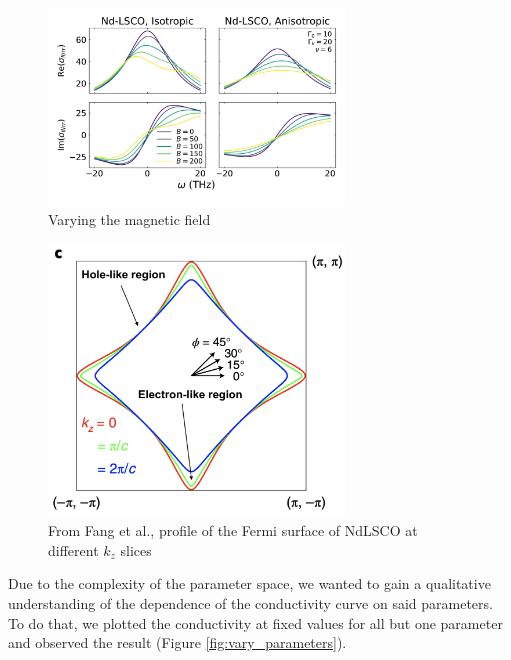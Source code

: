 \begin{figure}
    \centering
    \includegraphics[width=0.7\textwidth]{figures/vary_field}
    \caption{Varying the magnetic field}
    \label{fig:vary_field}
\end{figure}

\begin{figure}
    \centering
    \includegraphics[width=0.7\textwidth]{figures/fermi_surface.png}
    \caption{From Fang et al.\cite{fang2022}, profile of the Fermi surface of NdLSCO at different $k_z$ slices}
    \label{fig:fermi_surface}
\end{figure}


Due to the complexity of the parameter space, 
we wanted to gain a qualitative understanding of the dependence of the conductivity curve on said parameters. 
To do that, we plotted the conductivity at fixed values for all but one parameter and observed the result
(Figure \ref{fig:vary_parameters}).

